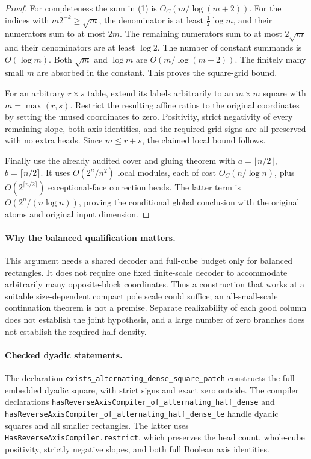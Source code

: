 \documentclass[11pt]{article}
\begin{document}
\begin{proof}
For completeness the sum in (1) is $O_C(m/\log(m+2))$. For the indices
with $m2^{-k}\geq\sqrt m$, the denominator is at least
$\tfrac12\log m$, and their numerators sum to at most $2m$.
The remaining numerators sum to at most $2\sqrt m$ and their
denominators are at least $\log2$. The number of constant summands is
$O(\log m)$. Both $\sqrt m$ and $\log m$ are
$O(m/\log(m+2))$. The finitely many small $m$ are absorbed in the
constant. This proves the square-grid bound.

For an arbitrary $r\times s$ table, extend its labels arbitrarily to
an $m\times m$ square with $m=\max(r,s)$. Restrict the resulting affine
ratios to the original coordinates by setting the unused coordinates
to zero. Positivity, strict negativity of every remaining slope, both
axis identities, and the required grid signs are all preserved with
no extra heads. Since $m\leq r+s$, the claimed local bound follows.

Finally use the already audited cover and gluing theorem with
$a=\lfloor n/2\rfloor$, $b=\lceil n/2\rceil$. It uses
$O(2^n/n^2)$ local modules, each of cost $O_C(n/\log n)$, plus
$O(2^{\lceil n/2\rceil})$ exceptional-face correction heads.
The latter term is $O(2^n/(n\log n))$, proving the conditional global
conclusion with the original atoms and original input dimension.
\end{proof}

\paragraph{Why the balanced qualification matters.}
This argument needs a shared decoder and full-cube budget only for
balanced rectangles. It does not require one fixed finite-scale decoder
to accommodate arbitrarily many opposite-block coordinates. Thus a
construction that works at a suitable size-dependent compact pole scale
could suffice; an all-small-scale continuation theorem is not a premise.
Separate realizability of each good column does not establish the joint
hypothesis, and a large number of zero branches does not establish the
required half-density.

\paragraph{Checked dyadic statements.}
The declaration \texttt{exists\_alternating\_dense\_square\_patch}
constructs the full embedded dyadic square, with strict signs and exact
zero outside. The compiler declarations
\texttt{hasReverseAxisCompiler\_of\_alternating\_half\_dense} and
\texttt{hasReverseAxisCompiler\_of\_alternating\_half\_dense\_le}
handle dyadic squares and all smaller rectangles. The latter uses
\texttt{HasReverseAxisCompiler.restrict}, which preserves the head count,
whole-cube positivity, strictly negative slopes, and both full Boolean
axis identities.
\end{document}
